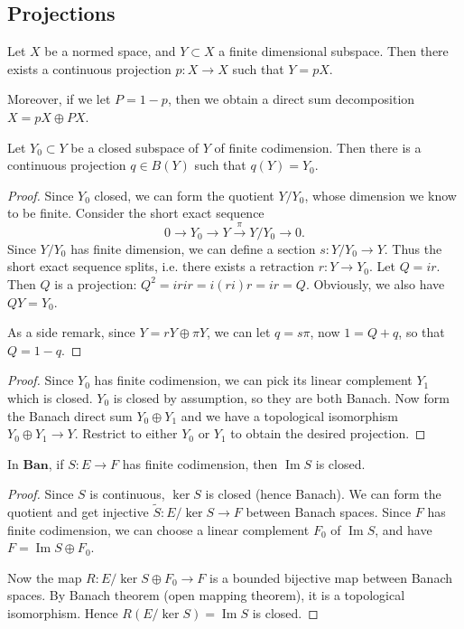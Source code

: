 
\subsection{Projections}

\begin{lemma}
	\label{lem:FiniteDimSubspaceProj}
	Let $X$ be a normed space, and $Y \subset X$ a finite dimensional subspace. Then there exists a continuous projection $p: X \to X$ such that $Y = p X$. 

	Moreover, if we let $P = 1 - p$, then we obtain a direct sum decomposition $X = pX \oplus PX$.
\end{lemma}

\begin{lemma}
	\label{lem:FiniteCodimSubspaceProj}
	Let $Y_0 \subset Y$ be a closed subspace of $Y$ of finite codimension. Then there is a continuous projection $q \in B(Y)$ such that $q(Y) = Y_0$.
\end{lemma}
\begin{proof}
	Since $Y_0$ closed, we can form the quotient $Y / Y_0$, whose dimension we know to be finite. Consider the short exact sequence
	\[
		0 \to Y_0 \to Y \xrightarrow{\pi} Y / Y_0 \to 0
	.\] 
	Since $Y / Y_0$ has finite dimension, we can define a section $s: Y / Y_0 \to Y$. 
	Thus the short exact sequence splits, i.e. there exists a retraction $r: Y \to Y_0$. Let $Q = i r$. Then $Q$ is a projection: $Q^2 = irir = i(ri)r = ir = Q$. Obviously, we also have $Q Y = Y_0$.

	As a side remark, since $Y = r Y \oplus \pi Y$, we can let $q = s \pi$, now $1 = Q + q$, so that $Q = 1 - q$.
\end{proof}
\begin{proof}
	Since $Y_0$ has finite codimension, we can pick its linear complement $Y_1$ which is closed. $Y_0$ is closed by assumption, so they are both Banach. Now form the Banach direct sum $Y_0 \oplus Y_1$ and we have a topological isomorphism $Y_0 \oplus Y_1 \to Y$. Restrict to either $Y_0$ or $Y_1$ to obtain the desired projection.
\end{proof}

\begin{lemma}
	\label{lem:ImageClosed}
	In $\mathbf{Ban}$, if $S: E \to F$ has finite codimension, then $\operatorname{Im} S$ is closed.
\end{lemma}
\begin{proof}
	Since $S$ is continuous, $\operatorname{ker} S$ is closed (hence Banach). We can form the quotient and get injective $\tilde S: E / \operatorname{ker} S \to F$ between Banach spaces. Since $F$ has finite codimension, we can choose a linear complement $F_0$ of $\operatorname{Im} S$, and have $F = \operatorname{Im} S \oplus F_0$.

	Now the map $R: E / \operatorname{ker} S \oplus F_0 \to F$ is a bounded bijective map between Banach spaces. By Banach theorem (open mapping theorem), it is a topological isomorphism. Hence $R( E / \operatorname{ker} S) = \operatorname{Im} S$ is closed.
\end{proof}

